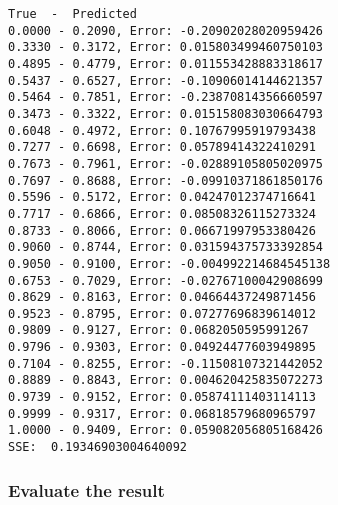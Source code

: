 \documentclass{article}
\begin{document}
    \begin{Verbatim}[commandchars=\\\{\}]
True  -  Predicted
0.0000 - 0.2090, Error: -0.20902028020959426
0.3330 - 0.3172, Error: 0.015803499460750103
0.4895 - 0.4779, Error: 0.011553428883318617
0.5437 - 0.6527, Error: -0.10906014144621357
0.5464 - 0.7851, Error: -0.23870814356660597
0.3473 - 0.3322, Error: 0.015158083030664793
0.6048 - 0.4972, Error: 0.10767995919793438
0.7277 - 0.6698, Error: 0.05789414322410291
0.7673 - 0.7961, Error: -0.02889105805020975
0.7697 - 0.8688, Error: -0.09910371861850176
0.5596 - 0.5172, Error: 0.04247012374716641
0.7717 - 0.6866, Error: 0.08508326115273324
0.8733 - 0.8066, Error: 0.06671997953380426
0.9060 - 0.8744, Error: 0.031594375733392854
0.9050 - 0.9100, Error: -0.004992214684545138
0.6753 - 0.7029, Error: -0.02767100042908699
0.8629 - 0.8163, Error: 0.04664437249871456
0.9523 - 0.8795, Error: 0.07277696839614012
0.9809 - 0.9127, Error: 0.0682050595991267
0.9796 - 0.9303, Error: 0.04924477603949895
0.7104 - 0.8255, Error: -0.11508107321442052
0.8889 - 0.8843, Error: 0.004620425835072273
0.9739 - 0.9152, Error: 0.05874111403114113
0.9999 - 0.9317, Error: 0.06818579680965797
1.0000 - 0.9409, Error: 0.059082056805168426
SSE:  0.19346903004640092
    \end{Verbatim}

    \hypertarget{evaluate-the-result}{%
\subsubsection{Evaluate the result}\label{evaluate-the-result}}
\end{document}
